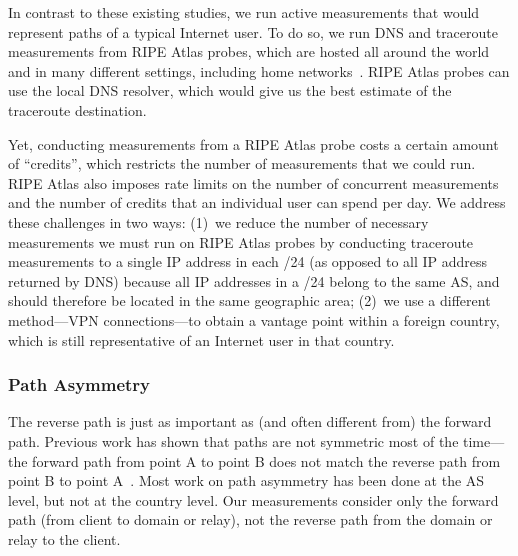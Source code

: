 In contrast to these existing studies, we run active measurements that
would represent paths of a typical Internet user. To do so, we run
DNS and traceroute measurements from RIPE Atlas probes, which are hosted
all around the world and in many different settings, including home
networks~\cite{ripe_atlas}.  RIPE Atlas probes can use the local DNS
resolver, which would give us the best estimate of the traceroute
destination.

Yet, conducting measurements from a RIPE Atlas probe costs a certain
amount of ``credits'', which restricts the number of measurements that we
could run.  RIPE Atlas also imposes rate limits on the number of
concurrent measurements and the number of credits that an individual
user can spend per day.  We address these challenges in two ways: (1)~we
reduce the number of necessary measurements we must run on RIPE Atlas
probes by conducting traceroute measurements to a single IP address in
each /24 (as opposed to all IP address returned by DNS) because all IP
addresses in a /24 belong to the same AS, and should therefore be
located in the same geographic area; (2)~we use a different method---VPN
connections---to obtain a vantage point within a foreign country, which
is still representative of an Internet user in that country.

\subsubsection{Path Asymmetry}
\label{path_sym}

The reverse path is just as important as (and often different from) the 
forward path.  
Previous work has shown that paths are not symmetric most of the
time---the forward path from point A to point B does not match the
reverse path from point B to point A~\cite{he2005routing}.  Most work on
path asymmetry has been done at the AS level, but not at the country
level.  Our measurements consider only the forward path (from client
to domain or relay), not the reverse path from the domain or
relay to the client.   

